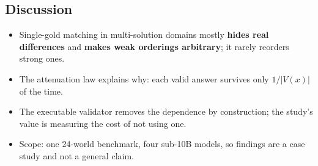 \documentclass[11pt,a4paper]{article}
\begin{document}
\subsection{Discussion}
\begin{itemize}
\item Single-gold matching in multi-solution domains mostly \textbf{hides real differences} and \textbf{makes weak orderings arbitrary}; it rarely reorders strong ones.
\item The attenuation law explains why: each valid answer survives only $1/|V(x)|$ of the time.
\item The executable validator removes the dependence by construction; the study's value is measuring the cost of not using one.
\item Scope: one 24-world benchmark, four sub-10B models, so findings are a case study and not a general claim.
\end{itemize}

\end{document}
